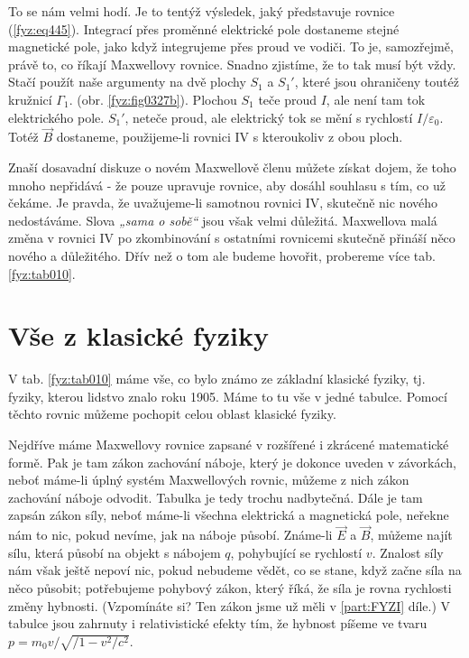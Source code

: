   To se nám velmi hodí. Je to tentýž výsledek, jaký představuje rovnice (\ref{fyz:eq445}). 
  Integrací přes proměnné elektrické pole dostaneme stejné magnetické pole, jako když integrujeme 
  přes proud ve vodiči. To je, samozřejmě, právě to, co říkají Maxwellovy rovnice. Snadno zjistíme, 
  že to tak musí být vždy. Stačí použít naše argumenty na dvě plochy \(S_1\) a \(S_1'\), které jsou 
  ohraničeny toutéž kružnicí \(\Gamma_1\). (obr. \ref{fyz:fig0327b}). Plochou \(S_1\) teče proud 
  \(I\), ale není tam tok elektrického pole. \(S_1'\), neteče proud, ale elektrický tok se mění s 
  rychlostí \(I/\varepsilon_0\). Totéž \(\vec{B}\) dostaneme, použijeme-li rovnici IV s kteroukoliv 
  z obou ploch. 
  
  Znaší dosavadní diskuze o novém Maxwellově členu můžete získat dojem, že toho mnoho nepřidává - 
  že pouze upravuje rovnice, aby dosáhl souhlasu s tím, co už čekáme. Je pravda, že uvažujeme-li 
  samotnou rovnici IV, skutečně nic nového nedostáváme. Slova \emph{„sama o sobě“} jsou však velmi 
  důležitá. Maxwellova malá změna v rovnici IV po zkombinování s ostatními rovnicemi skutečně 
  přináší něco nového a důležitého. Dřív než o tom ale budeme hovořit, probereme více tab. 
  \ref{fyz:tab010}.
  
\section{Vše z klasické fyziky}\label{fyz:IIchapXVIIIsecII}
  V tab. \ref{fyz:tab010} máme vše, co bylo známo ze základní klasické fyziky, tj. fyziky, kterou 
  lidstvo znalo roku 1905. Máme to tu vše v jedné tabulce. Pomocí těchto rovnic můžeme pochopit 
  celou oblast klasické fyziky.
  
  Nejdříve máme Maxwellovy rovnice zapsané v rozšířené i zkrácené matematické formě. Pak je tam 
  zákon zachování náboje, který je dokonce uveden v závorkách, neboť máme-li úplný systém 
  Maxwellových rovnic, můžeme z nich zákon zachování náboje odvodit. Tabulka je tedy trochu 
  nadbytečná. Dále je tam zapsán zákon síly, neboť máme-li všechna elektrická a magnetická pole, 
  neřekne nám to nic, pokud nevíme, jak na náboje působí. Známe-li \(\vec{E}\) a \(\vec{B}\), 
  můžeme najít sílu, která působí na objekt s nábojem \(q\), pohybující se rychlostí \(v\). Znalost 
  síly nám však ještě nepoví nic, pokud nebudeme vědět, co se stane, když začne síla na něco 
  působit; potřebujeme pohybový zákon, který říká, že síla je rovna rychlosti změny hybnosti. 
  (Vzpomínáte si? Ten zákon jsme už měli v \ref{part:FYZI} díle.) V tabulce jsou zahrnuty i 
  relativistické efekty tím, že hybnost píšeme ve tvaru \(p = m_0v/\sqrt{/1 - v^2/c^2}\).
  
